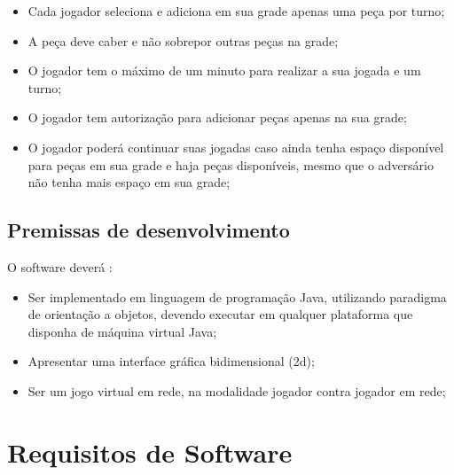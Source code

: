 \documentclass[
	12pt,	
	openany,			
	oneside,			
	a4paper,			
	english,			
	french,			
	spanish,			
	brazil,	
	]{abntex2}
\begin{document}
\begin{itemize}
\item Cada jogador seleciona e adiciona em sua grade apenas uma peça por turno;
\item A peça deve caber e não sobrepor outras peças na grade;
\item O jogador tem o máximo de um minuto para realizar a sua jogada e um turno;
\item O jogador tem autorização para adicionar peças apenas na sua grade;
\item O jogador poderá continuar suas jogadas caso ainda tenha espaço disponível para peças em sua grade e haja peças disponíveis, mesmo que o adversário não tenha mais espaço em sua grade;
\end{itemize}

\section{Premissas de desenvolvimento}

O software deverá :

\begin{itemize}
\item Ser implementado em linguagem de programação Java, utilizando paradigma de orientação a objetos, devendo executar em qualquer plataforma que disponha de máquina virtual Java;
\item Apresentar uma interface gráfica bidimensional (2d);
\item Ser um jogo virtual em rede, na modalidade jogador contra jogador em rede;
\end{itemize}

\chapter{Requisitos de Software}
\end{document}
